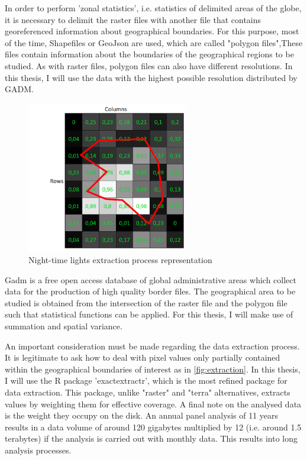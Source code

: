 In order to perform 'zonal statistics', i.e. statistics of delimited areas of the globe, it is necessary to delimit the raster files with another file that contains georeferenced information about geographical boundaries. For this purpose, most of the time, Shapefiles or GeoJson are used, which are called "polygon files",These files contain information about the boundaries of the geographical regions to be studied. As with raster files, polygon files can also have different resolutions. In this thesis, I will use the data with the highest possible resolution distributed by GADM.
\begin{figure}[h]
    \begin{center}
    \includegraphics[width=7cm]{images/raster_night_cover.png}
    \end{center}
    \caption{Night-time lights extraction process representation}
    \label{fig:extraction}
\end{figure}
Gadm is a free open access database of global administrative areas which collect data for the production of high quality border files.
The geographical area to be studied is obtained from the intersection of the raster file and the polygon file such that statistical functions can be applied. For this thesis, I will make use of summation and spatial variance.

An important consideration must be made regarding the data extraction process. It is legitimate to ask how to deal with pixel values only partially contained within the geographical boundaries of interest as in \autoref{fig:extraction}. In this thesis, I will use the R package 'exactextractr', which is the most refined package for data extraction. This package, unlike "raster" and "terra" alternatives, extracts values by weighting them for effective coverage. 
A final note on the analysed data is the weight they occupy on the disk. An annual panel analysis of 11 years results in a data volume of around 120 gigabytes multiplied by 12 (i.e. around 1.5 terabytes) if the analysis is carried out with monthly data. This results into long analysis processes.


